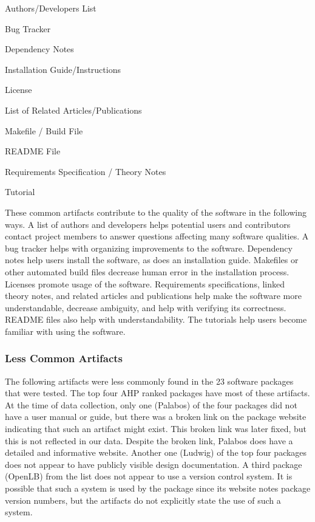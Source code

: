 \documentclass[12pt, notitlepage]{article}
\begin{document}
\begin{multicols}{2}	
\begin{itemize}
\end{itemize}
\end{multicols}


These common artifacts contribute to the quality of the software in the following ways. A list of authors and developers helps potential users and contributors contact project members to answer questions affecting many software qualities. A bug tracker helps with organizing improvements to the software. Dependency notes help users install the software, as does an installation guide. Makefiles or other automated build files decrease human error in the installation process. Licenses promote usage of the software. Requirements specifications, linked theory notes, and related articles and publications help make the software more understandable, decrease ambiguity, and help with verifying its correctness. README files also help with understandability. The tutorials help users become familiar with using the software.


\subsubsection{Less Common Artifacts}
The following artifacts were less commonly found in the 23 software packages that were tested. The top four AHP ranked packages have most of these artifacts.
At the time of data collection, only one (Palabos) of the four packages did not have a user manual or guide, but there was a broken link on the package website indicating that such an artifact might exist. This broken link was later fixed, but this is not reflected in our data. Despite the broken link, Palabos does have a detailed and informative website. Another one (Ludwig) of the top four packages does not appear to have publicly visible design documentation. A third package (OpenLB) from the list does not appear to use a version control system. It is possible that such a system is used by the package since its website notes package version numbers, but the artifacts do not explicitly state the use of such a system.
\end{document}
